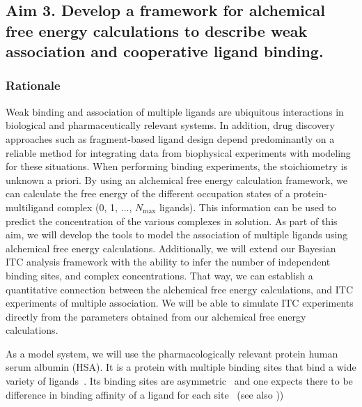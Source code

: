 \documentclass[10pt,final]{article}
\begin{document}

\subsection*{Aim 3. Develop a framework for alchemical free energy calculations to describe weak association and cooperative ligand binding.}
\subsubsection*{Rationale}
Weak binding and association of multiple ligands are ubiquitous interactions in biological and pharmaceutically relevant systems.
%
In addition, drug discovery approaches such as fragment-based ligand design depend predominantly on a reliable method for integrating data from biophysical experiments with modeling for these situations.
%
When performing binding experiments, the stoichiometry is unknown a priori.
%
By using an alchemical free energy calculation framework, we can calculate the free energy of the different occupation states of a protein-multiligand complex (0, 1, $\dots$, $N_\mathrm{max}$ ligands).
%
This information can be used to predict the concentration of the various complexes in solution.
%
As part of this aim, we will develop the tools to model the association of multiple ligands using alchemical free energy calculations.
%
Additionally, we will extend our Bayesian ITC analysis framework with the ability to infer the number of independent binding sites, and complex concentrations.
%
That way, we can establish a quantitative connection between the alchemical free energy calculations, and ITC experiments of multiple association.
%
We will be able to simulate ITC experiments directly from the parameters obtained from our alchemical free energy calculations.

As a model system, we will use the pharmacologically relevant protein human serum albumin (HSA).
%
It is a protein with multiple binding sites that bind a wide variety of ligands~\cite{He1992a,Kragh-Hansen2002a,Sulkowska2002a}.
%
Its binding sites are asymmetric~\cite{He1992a, Curry1998a} and one expects there to be difference in binding affinity of a ligand for each site~\cite{Sudlow1976a} (see also ))
\end{document}
